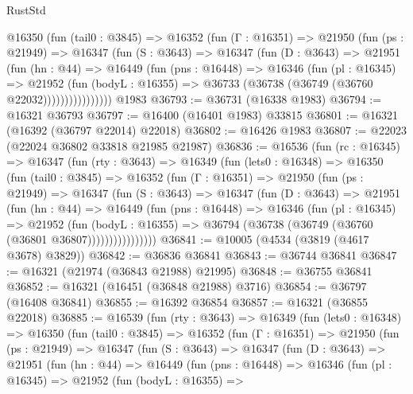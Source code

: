 \begin{lexlean}{RustStd}
\begin{coremodule}
          @16350
            (fun (tail0 : @3845) =>
            @16352
              (fun (Γ : @16351) =>
              @21950
                (fun (ps : @21949) =>
                @16347
                  (fun (S : @3643) =>
                  @16347
                    (fun (D : @3643) =>
                    @21951
                      (fun (hn : @44) =>
                      @16449
                        (fun (pns : @16448) =>
                        @16346
                          (fun (pl : @16345) =>
                          @21952
                            (fun (bodyL : @16355) =>
                            @36733 (@36738 (@36749 (@36760 @22032))))))))))))))))
    @1983
@36793 := @36731 (@16338 @1983)
@36794 := @16321 @36793
@36797 := @16400 (@16401 @1983) @33815
@36801 := @16321 (@16392 (@36797 @22014) @22018)
@36802 := @16426 @1983
@36807 := @22023 (@22024 @36802 @33818 @21985 @21987)
@36836 := @16536
    (fun (rc : @16345) =>
    @16347
      (fun (rty : @3643) =>
      @16349
        (fun (lets0 : @16348) =>
        @16350
          (fun (tail0 : @3845) =>
          @16352
            (fun (Γ : @16351) =>
            @21950
              (fun (ps : @21949) =>
              @16347
                (fun (S : @3643) =>
                @16347
                  (fun (D : @3643) =>
                  @21951
                    (fun (hn : @44) =>
                    @16449
                      (fun (pns : @16448) =>
                      @16346
                        (fun (pl : @16345) =>
                        @21952
                          (fun (bodyL : @16355) =>
                          @36794 (@36738 (@36749 (@36760 (@36801 @36807))))))))))))))))
@36841 := @10005 (@4534 (@3819 (@4617 @3678) @3829))
@36842 := @36836 @36841
@36843 := @36744 @36841
@36847 := @16321 (@21974 (@36843 @21988) @21995)
@36848 := @36755 @36841
@36852 := @16321 (@16451 (@36848 @21988) @3716)
@36854 := @36797 (@16408 @36841)
@36855 := @16392 @36854
@36857 := @16321 (@36855 @22018)
@36885 := @16539
    (fun (rty : @3643) =>
    @16349
      (fun (lets0 : @16348) =>
      @16350
        (fun (tail0 : @3845) =>
        @16352
          (fun (Γ : @16351) =>
          @21950
            (fun (ps : @21949) =>
            @16347
              (fun (S : @3643) =>
              @16347
                (fun (D : @3643) =>
                @21951
                  (fun (hn : @44) =>
                  @16449
                    (fun (pns : @16448) =>
                    @16346
                      (fun (pl : @16345) =>
                      @21952
                        (fun (bodyL : @16355) =>

\end{coremodule}
\end{lexlean}
